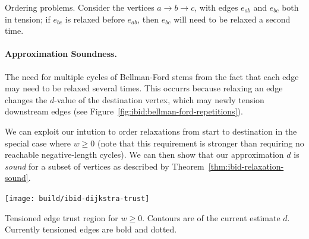\begin{marginfigure}
   \caption{Ordering problems.
      Consider the vertices $a \rightarrow b \rightarrow c$,
      with edges $e_{ab}$ and $e_{bc}$ both in tension;
      if $e_{bc}$ is relaxed before $e_{ab}$,
      then $e_{bc}$ will need to be relaxed a second time.}
   \label{fig:ibid:bellman-ford-repetitions}
\end{marginfigure}

\paragraph{Approximation Soundness.}
The need for multiple cycles of Bellman-Ford stems from the fact
that each edge may need to be relaxed several times.
This occurrs because relaxing an edge changes the
$d$-value of the destination vertex,
which may newly tension downstream edges
(see Figure~\ref{fig:ibid:bellman-ford-repetitions}).

We can exploit our intution to order relaxations from start to destination
in the special case where $w \geq 0$
(note that this requirement is stronger than requiring no reachable
negative-length cycles).
We can then show that our approximation $d$
is \emph{sound} for a subset of vertices
as described by Theorem~\ref{thm:ibid-relaxation-sound}.

\begin{marginfigure}
   \centering
   \texttt{[image: build/ibid-dijkstra-trust]}
   \caption{Tensioned edge trust region
      for $w \geq 0$.
      Contours are of the current estimate $d$.
      Currently tensioned edges are bold and dotted.}
\end{marginfigure}


